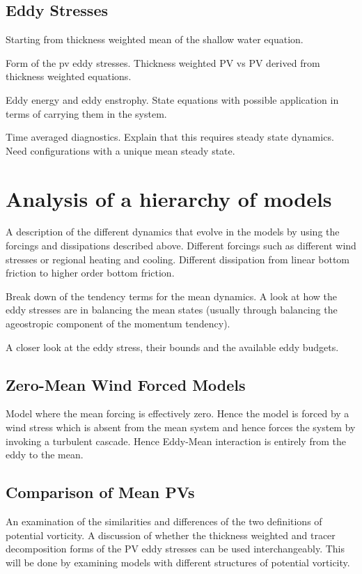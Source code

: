 \documentclass[10pt,a4paper]{report}
\begin{document}
\section{Eddy Stresses}

Starting from thickness weighted mean of the shallow water
equation. 

Form of the pv eddy stresses.
Thickness weighted PV vs PV derived from thickness 
weighted equations.

Eddy energy and eddy enstrophy. State equations with 
possible application in terms of carrying them in the system.

Time averaged diagnostics. Explain that this 
requires steady state dynamics. Need configurations
with a unique mean steady state.

\chapter{Analysis of a hierarchy of models}

A description of the different dynamics that evolve
in the models by using the forcings and 
dissipations described above. Different forcings
such as different wind stresses or regional heating
and cooling. Different dissipation from
linear bottom friction to higher order bottom
friction.

Break down of the tendency terms for the mean
dynamics. A look at how the eddy stresses are 
in balancing the mean states (usually through
balancing the ageostropic component of the
momentum tendency).

A closer look at the eddy stress, their bounds 
and the available eddy budgets.

\section{Zero-Mean Wind Forced Models}

Model where the mean forcing is effectively zero. 
Hence the model is forced by a wind stress which is
absent from the mean system and hence forces the
system by 
invoking a turbulent cascade. Hence Eddy-Mean
interaction is entirely from the eddy to the mean.

\section{Comparison of Mean PVs}

An examination of the similarities and differences
of the two definitions of potential vorticity. 
A discussion of whether the thickness
weighted and tracer decomposition forms of the
PV eddy stresses can be used interchangeably.
This will be done by examining models with
different structures of potential vorticity.
\end{document}
